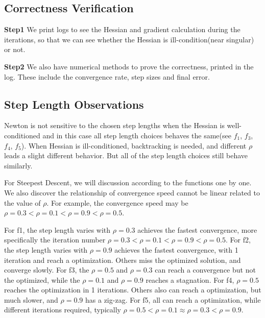 \documentclass[12pt]{article}
\begin{document}
\subsection{Correctness Verification}

\textbf{Step1} We print logs to see the Hessian and gradient calculation during the iterations, so that we can see whether the Hessian is ill-condition(near singular) or not.

\textbf{Step2} We also have numerical methods to prove the correctness, printed in the log. These include the convergence rate, step sizes and final error. 


\subsection{Step Length Observations}
Newton is not sensitive to the chosen step lengths when the Hessian is well-conditioned and in this case all step length choices behaves the same(see $f_1$, $f_3$, $f_4$, $f_5$). When Hessian is ill-conditioned, backtracking is needed, and different $\rho$ leads a slight different behavior. But all of the step length choices still behave similarly.

For Steepest Descent, we will discussion according to the functions one by one. We also discover the relationship of convergence speed cannot be linear related to the value of $\rho$. For example, the convergence speed may be $\rho=0.3<\rho=0.1<\rho=0.9<\rho=0.5$.

For f1, the step length varies with $\rho=0.3$ achieves the fastest convergence, more specifically the iteration number $\rho=0.3<\rho=0.1<\rho=0.9<\rho=0.5$. 
For f2, the step length varies with $\rho=0.9$ achieves the fastest convergence, with 1 iteration and reach a optimization. Others miss the optimized solution, and converge slowly. 
For f3, the $\rho=0.5$ and $\rho=0.3$ can reach a convergence but not the optimized, while the $\rho=0.1$ and $\rho=0.9$ reaches a stagnation.
For f4, $\rho=0.5$ reaches the optimization in 1 iterations. Others also can reach a optimization, but much slower, and $\rho=0.9$ has a zig-zag.
For f5, all can reach a optimization, while different iterations required, typically $\rho=0.5 < \rho=0.1 \approx \rho=0.3 < \rho=0.9$.
\end{document}
